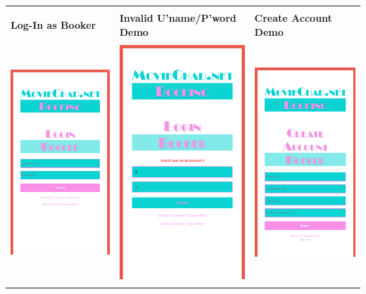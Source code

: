 \documentclass[11pt, english]{article}
\begin{document}
\begin{center}
\begin{longtable}{p{5cm}p{5cm}p{5cm}}
		& \\
		\textbf{Log-In as Booker} & \textbf{Invalid U'name/P'word Demo} & \textbf{Create Account Demo}\\
		\includegraphics[width=5cm,height=9cm]{CS993_IMG/login3.png} & \includegraphics[width=5cm,height=9cm]{CS993_IMG/login4.png} & \includegraphics[width=5cm,height=9cm]{CS993_IMG/login5.png}\\
        \end{longtable}
        \end{center}
\end{document}
